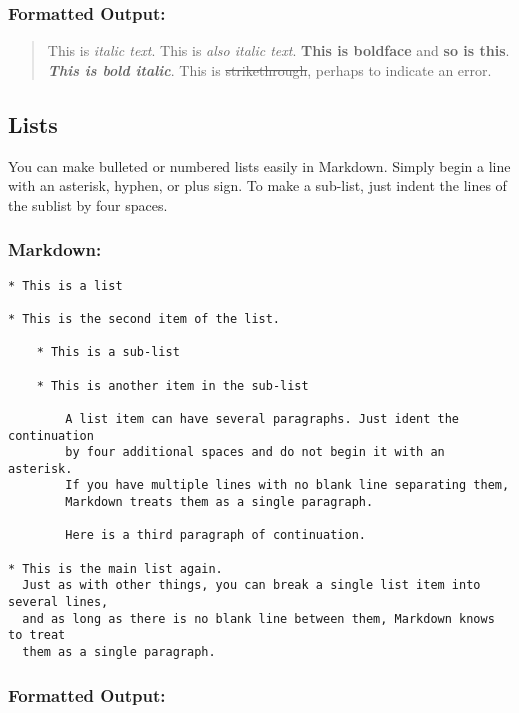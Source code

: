 \documentclass[
]{article}
\begin{document}
\hypertarget{formatted-output-2}{%
\subsubsection{Formatted Output:}\label{formatted-output-2}}

\begin{quote}
This is \emph{italic text}. This is \emph{also italic text}.
\textbf{This is boldface} and \textbf{so is this}. \textbf{\emph{This is
bold italic}}. This is \sout{strikethrough}, perhaps to indicate an
error.
\end{quote}

\hypertarget{lists}{%
\subsection{Lists}\label{lists}}

You can make bulleted or numbered lists easily in Markdown. Simply begin
a line with an asterisk, hyphen, or plus sign. To make a sub-list, just
indent the lines of the sublist by four spaces.

\hypertarget{markdown-4}{%
\subsubsection{Markdown:}\label{markdown-4}}

\begin{verbatim}
* This is a list

* This is the second item of the list.

    * This is a sub-list

    * This is another item in the sub-list
    
        A list item can have several paragraphs. Just ident the continuation 
        by four additional spaces and do not begin it with an asterisk.
        If you have multiple lines with no blank line separating them,
        Markdown treats them as a single paragraph.

        Here is a third paragraph of continuation.

* This is the main list again.
  Just as with other things, you can break a single list item into several lines,
  and as long as there is no blank line between them, Markdown knows to treat
  them as a single paragraph.
\end{verbatim}

\hypertarget{formatted-output-3}{%
\subsubsection{Formatted Output:}\label{formatted-output-3}}
\end{document}
